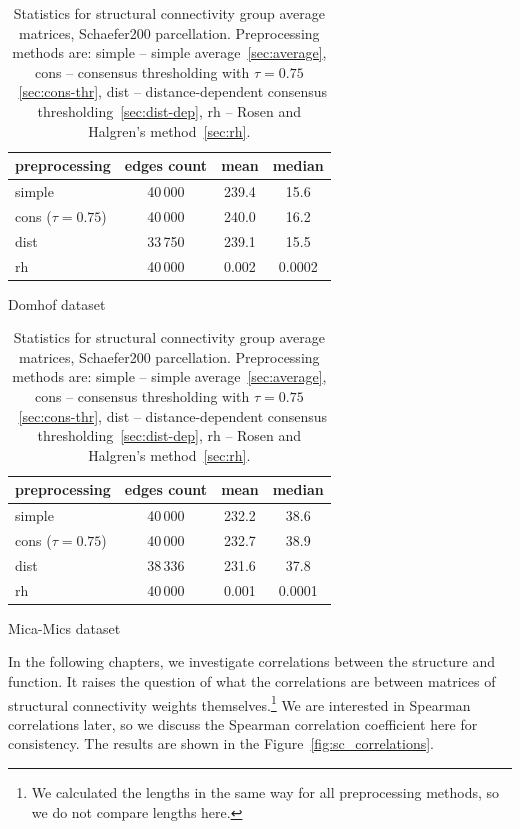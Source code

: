 \begin{table}[h!]
\begin{subtable}{\textwidth}
    \centering
    \begin{tabular}{l | c | c | c }
        preprocessing & edges count & mean	& median\\
        \midrule
        simple             &40\,000  &239.4  &15.6	\\
        cons ($\tau=0.75$) &40\,000	&240.0	&16.2	\\
        dist               &33\,750	&239.1	&15.5	\\
        rh                 &40\,000	&0.002	&0.0002 \\
    \end{tabular}
    \caption{Domhof dataset}
    \label{tab:sc_stats_domhof}
\end{subtable}

\bigskip

\begin{subtable}{\textwidth}
    \centering
    \begin{tabular}{l | c | c | c }
        preprocessing & edges count & mean	& median\\
        \midrule
        simple             &40\,000  &232.2	&38.6	\\
        cons ($\tau=0.75$) &40\,000	&232.7	&38.9	\\
        dist               &38\,336	&231.6	&37.8	\\
        rh                 &40\,000	&0.001	&0.0001 \\
    \end{tabular}
    \caption{Mica-Mics dataset}
    \label{tab:sc_stats_mica}
\end{subtable}
    \caption[Statistics for structural connectivity group average matrices]{Statistics for structural connectivity group average matrices, Schaefer200 parcellation. Preprocessing methods are: simple -- simple average~\ref{sec:average}, cons -- consensus thresholding with $\tau=0.75$~\ref{sec:cons-thr}, dist -- distance-dependent consensus thresholding~\ref{sec:dist-dep}, rh -- Rosen and Halgren's method~\ref{sec:rh}. }
    \label{tab:sc_stats}
\end{table}

In the following chapters, we investigate correlations between the structure and function. It raises the question of what the correlations are between matrices of structural connectivity weights themselves.\footnote{We calculated the lengths in the same way for all preprocessing methods, so we do not compare lengths here.} We are interested in Spearman correlations later, so we discuss the Spearman correlation coefficient here for consistency. The results are shown in the Figure~\ref{fig:sc_correlations}. 

